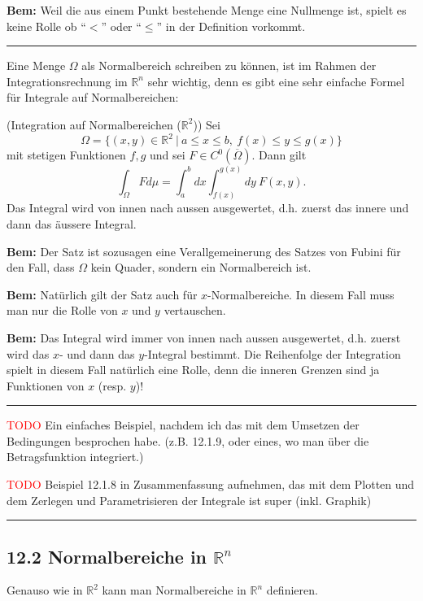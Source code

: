 \documentclass[a4paper,landscape,8pt]{extarticle}
\newcommand{\R}{\mathbb{R}}
\newcommand{\setsep}{\ \vert \ }
\newcommand{\todo}{\textcolor{red}{TODO }}
\newcommand{\sep}{\vspace{5pt}\noindent\hrule\vspace{5pt}}
\newcommand{\Bem}{\textbf{Bem: }}
\begin{document}
\begin{multicols*}{4}
\Bem Weil die aus einem Punkt bestehende Menge eine Nullmenge ist, spielt es
keine Rolle ob ``$<$'' oder ``$\leq$'' in der Definition vorkommt.

\sep

Eine Menge $\Omega$ als Normalbereich schreiben zu können, ist im Rahmen der
Integrationsrechnung im $\R^n$ sehr wichtig, denn es gibt eine sehr einfache
Formel für Integrale auf Normalbereichen:

\Satz (Integration auf Normalbereichen ($\R^2$)) Sei
\[
\Omega = \{(x,y)\in\R^2 \setsep a\leq x\leq b, \ f(x)\leq y \leq g(x)\}
\]
mit stetigen Funktionen $f,g$ und sei $F\in{C^0}(\overline{\Omega})$. Dann gilt
\[
\int_\Omega F d\mu = \int_a^b dx\int_{f(x)}^{g(x)} dy \ F(x,y).
\]
Das Integral wird von innen nach aussen ausgewertet, d.h. zuerst das innere und
dann das äussere Integral.

\Bem Der Satz ist sozusagen eine Verallgemeinerung des Satzes von Fubini für den
Fall, dass $\Omega$ kein Quader, sondern ein Normalbereich ist.

\Bem Natürlich gilt der Satz auch für $x$-Normalbereiche. In diesem Fall muss
man nur die Rolle von $x$ und $y$ vertauschen.

\Bem Das Integral wird immer von innen nach aussen ausgewertet, d.h. zuerst
wird das $x$- und dann das $y$-Integral bestimmt. Die Reihenfolge der
Integration spielt in diesem Fall natürlich eine Rolle, denn die inneren Grenzen
sind ja Funktionen von $x$ (resp. $y$)!

\begin{warmup}

\sep

\Bsp 

\todo Ein einfaches Beispiel, nachdem ich das mit dem Umsetzen der Bedingungen
besprochen habe. (z.B. 12.1.9, oder eines, wo man über die Betragsfunktion
integriert.)

\todo Beispiel 12.1.8 in Zusammenfassung aufnehmen, das mit dem Plotten und dem
Zerlegen und Parametrisieren der Integrale ist super (inkl. Graphik)


\sep

\end{warmup}

\subsection{12.2 Normalbereiche in $\R^n$}

Genauso wie in $\R^2$ kann man Normalbereiche in $\R^n$ definieren.


\end{multicols*}
\end{document}

